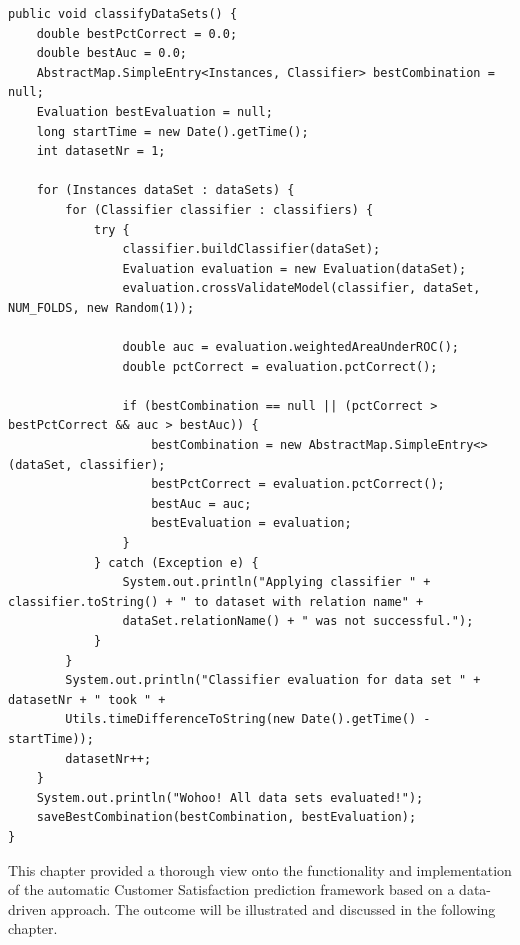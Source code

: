 \begin{lstlisting}[caption={Applying configured classifiers on preprocessed data sets}, label={lst:classificationEngine}]
public void classifyDataSets() {
	double bestPctCorrect = 0.0;
	double bestAuc = 0.0;
	AbstractMap.SimpleEntry<Instances, Classifier> bestCombination = null;
	Evaluation bestEvaluation = null;
	long startTime = new Date().getTime();
	int datasetNr = 1;
	
	for (Instances dataSet : dataSets) {
		for (Classifier classifier : classifiers) {
			try {
				classifier.buildClassifier(dataSet);
				Evaluation evaluation = new Evaluation(dataSet);
				evaluation.crossValidateModel(classifier, dataSet, NUM_FOLDS, new Random(1));
	
				double auc = evaluation.weightedAreaUnderROC();
				double pctCorrect = evaluation.pctCorrect();
				
				if (bestCombination == null || (pctCorrect > bestPctCorrect && auc > bestAuc)) {
					bestCombination = new AbstractMap.SimpleEntry<>(dataSet, classifier);
					bestPctCorrect = evaluation.pctCorrect();
					bestAuc = auc;
					bestEvaluation = evaluation;
				}
			} catch (Exception e) {
				System.out.println("Applying classifier " + classifier.toString() + " to dataset with relation name" +
				dataSet.relationName() + " was not successful.");
			}
		}
		System.out.println("Classifier evaluation for data set " + datasetNr + " took " +
		Utils.timeDifferenceToString(new Date().getTime() - startTime));
		datasetNr++;
	}
	System.out.println("Wohoo! All data sets evaluated!");
	saveBestCombination(bestCombination, bestEvaluation);
}
\end{lstlisting}

This chapter provided a thorough view onto the functionality and implementation of the automatic Customer Satisfaction prediction framework based on a data-driven approach. The outcome will be illustrated and discussed in the following chapter.







 




